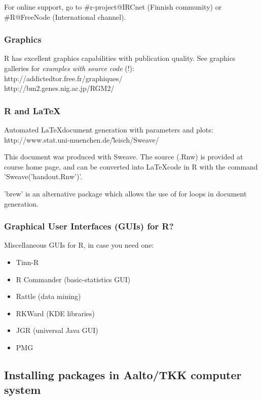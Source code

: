 \documentclass[10pt,a4paper]{article}
\begin{document}
For online support, go to \#r-project@IRCnet (Finnish community) or
\#R@FreeNode (International channel).


\subsubsection*{Graphics}

R has excellent graphics capabilities with publication quality. See
graphics galleries for {\it examples with source code} (!):\\
http://addictedtor.free.fr/graphiques/\\
http://bm2.genes.nig.ac.jp/RGM2/


\subsubsection*{R and \LaTeX}

Automated \LaTeX document generation with parameters and plots:\\
http://www.stat.uni-muenchen.de/\~leisch/Sweave/

This document was produced with Sweave. The source (.Rnw) is provided
at course home page, and can be converted into \LaTeX code in R with
the command 'Sweave('handout.Rnw')'.

'brew' is an alternative package which allows the use of for loops in
document generation.

\subsubsection*{Graphical User Interfaces (GUIs) for R?}

Miscellaneous GUIs for R, in case you need one:

\begin{itemize}
\item Tinn-R
\item R Commander (basic-statistics GUI)
\item Rattle (data mining)
\item RKWard (KDE libraries)
\item JGR (universal Java GUI)
\item PMG
\end{itemize}

\subsection{Installing packages in Aalto/TKK computer system}
\end{document}
